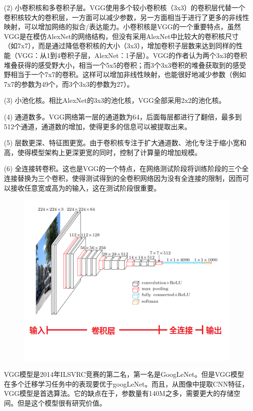 \documentclass{progbookcn}
\begin{document}
(2) 小卷积核和多卷积子层。VGG使用多个较小卷积核（3x3）的卷积层代替一个卷积核较大的卷积层，一方面可以减少参数，另一方面相当于进行了更多的非线性映射，可以增加网络的拟合/表达能力。小卷积核是VGG的一个重要特点，虽然VGG是在模仿AlexNet的网络结构，但没有采用AlexNet中比较大的卷积核尺寸（如7x7），而是通过降低卷积核的大小（3x3），增加卷积子层数来达到同样的性能（VGG：从1到4卷积子层，AlexNet：1子层）。VGG的作者认为两个3x3的卷积堆叠获得的感受野大小，相当一个5x5的卷积；而3个3x3卷积的堆叠获取到的感受野相当于一个7x7的卷积。这样可以增加非线性映射，也能很好地减少参数（例如7x7的参数为49个，而3个3x3的参数为27）。

(3) 小池化核。相比AlexNet的3x3的池化核，VGG全部采用2x2的池化核。

(4) 通道数多。VGG网络第一层的通道数为64，后面每层都进行了翻倍，最多到512个通道，通道数的增加，使得更多的信息可以被提取出来。

(5) 层数更深、特征图更宽。由于卷积核专注于扩大通道数、池化专注于缩小宽和高，使得模型架构上更深更宽的同时，控制了计算量的增加规模。

(6) 全连接转卷积。这也是VGG的一个特点，在网络测试阶段将训练阶段的三个全连接替换为三个卷积，使得测试得到的全卷积网络因为没有全连接的限制，因而可以接收任意宽或高为的输入，这在测试阶段很重要。	



\begin{figure}[H]
  \centering
  \includegraphics[scale = 0.7]{vgg_show.png}
\end{figure}

VGG模型是2014年ILSVRC竞赛的第二名，第一名是GoogLeNet。但是VGG模型在多个迁移学习任务中的表现要优于googLeNet。而且，从图像中提取CNN特征，VGG模型是首选算法。它的缺点在于，参数量有140M之多，需要更大的存储空间。但是这个模型很有研究价值。
\end{document}

